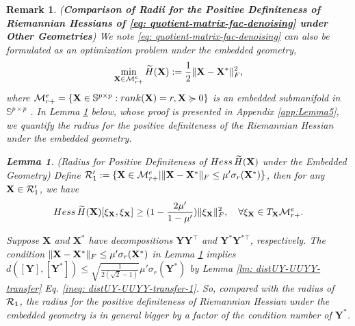 \documentclass[11pt]{article}
\newtheorem{Lemma}{Lemma}
\newtheorem{Remark}{Remark}
\newcommand{\bbS}{\mathbb{S}}
\newcommand{\0}{{\mathbf{0}}}
\newcommand{\1}{{\mathbf{1}}}
\newcommand{\X}{{\mathbf{X}}}
\newcommand{\Y}{{\mathbf{Y}}}
\newcommand{\cR}{{\cal R}}
\newcommand{\cM}{{\cal M}}
\newcommand{\rank}{{\rm rank}}
\newcommand{\Hess}{{\rm Hess}}
\newcommand{\F}{{\rm F}}
\begin{document}
\begin{Remark}({\bf Comparison of Radii for the Positive Definiteness of Riemannian Hessians of \eqref{eq: quotient-matrix-fac-denoising} under Other Geometries}) \label{rm: comparison-convexity-radius}
	We note \eqref{eq: quotient-matrix-fac-denoising} can also be formulated as an optimization problem under the embedded geometry, 
	\begin{equation} \label{eq: embedded-formulation-matrix-denoising}
		 \min_{\X  \in \cM_{r+}^e } \widetilde{H}(\X) := \frac{1}{2} \| \X - \X^* \|_\F^2,
	\end{equation} where $ \cM_{r+}^e = \{ \X\in  \bbS^{p \times p}: \rank(\X) = r, \X \succcurlyeq 0 \}$ is an embedded submanifold in $\bbS^{p \times p}$ \cite{vandereycken2009embedded}. In Lemma \ref{lm: positive-definite-Hessian-radius-embedded-geometry} below, whose proof is presented in Appendix \ref{app:Lemma5}, we quantify the radius for the positive definiteness of the Riemannian Hessian under the embedded geometry.
	

	\begin{Lemma}(Radius for Positive Definiteness of $\Hess\,\widetilde{H}(\X)$ under the Embedded Geometry) \label{lm: positive-definite-Hessian-radius-embedded-geometry} Define $\cR_1' := \{ \X \in \cM_{r+}^e | \|\X - \X^*\|_\F \leq \mu' \sigma_r(\X^*) \}$, then for any $\X \in \cR_1'$, we have
	\begin{equation*}
		\Hess\, \widetilde{H}(\X)[\xi_\X, \xi_\X] \geq (1 - \frac{2\mu'}{1-\mu'} )\|\xi_\X\|_\F^2 , \quad \forall \xi_\X \in T_{\X} \cM_{r+}^e.
	\end{equation*}
	\end{Lemma}


	Suppose $\X$ and $\X^*$ have decompositions $\Y\Y^\top$ and $\Y^*\Y^{*\top}$, respectively. The condition $ \|\X - \X^*\|_\F \leq \mu' \sigma_r(\X^*)$ in Lemma \ref{lm: positive-definite-Hessian-radius-embedded-geometry} implies $d([\Y], [\Y^*]) \leq \sqrt{\frac{1}{2(\sqrt{2} - 1)}} \mu' \sigma_r(\Y^*) $ by Lemma \ref{lm: distUY-UUYY-transfer} Eq. \eqref{ineq: distUY-UUYY-transfer-1}. So, compared with the radius of $\cR_1$, the radius for the positive definiteness of Riemannian Hessian under the embedded geometry is in general bigger by a factor of the condition number of $\Y^*$.
	

\end{Remark}
\end{document}
